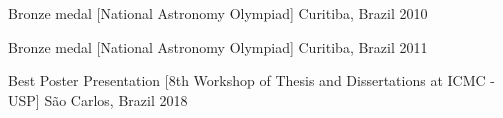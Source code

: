 

\begin{cvhonors}

  \cvhonor
    {Bronze medal} %
    [National Astronomy Olympiad] %
    {Curitiba, Brazil} %
    {2010} %

  \cvhonor
    {Bronze medal} %
    [National Astronomy Olympiad] %
    {Curitiba, Brazil} %
    {2011} %

  \cvhonor
    {Best Poster Presentation} %
    [8th Workshop of Thesis and Dissertations at ICMC - USP] %
    {São Carlos, Brazil} %
    {2018} %

\end{cvhonors}
